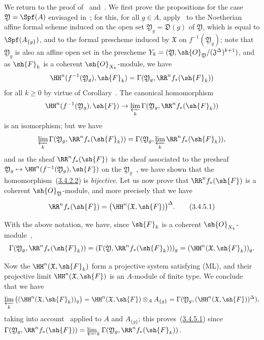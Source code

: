 \begin{env}[3.4.5]
\label{III.3.4.5}
We return to the proof of~ and~.
We first prove the propositions for the case $\mathfrak{Y}=\Spf(A)$ envisaged in~; for this, for all $g\in A$, apply~ to the Noetherian affine formal scheme induced on the open set $\mathfrak{Y}_g=\mathfrak{D}(g)$ of $\mathfrak{Y}$, which is equal to $\Spf(A_{\{g\}})$, and to the formal prescheme induced by $\mathfrak{X}$ on $f^{-1}(\mathfrak{Y}_g)$; note that $\mathfrak{Y}_g$ is also an affine open set in the prescheme $Y_k=(\mathfrak{Y},\sh{O}_\mathfrak{Y}/(\mathfrak{J}^\Delta)^{k+1})$, and as $\sh{F}_k$ is a coherent $\sh{O}_{X_k}$-module, we have
\[
  \HH^n(f^{-1}(\mathfrak{Y}_g),\sh{F}_k)=\Gamma(\mathfrak{Y}_g,\RR^n f_*(\sh{F}_k))
\]
for all $k\geq 0$ by virtue of Corollary~.
The canonical homomorphism
\[
  \HH^n(f^{-1}(\mathfrak{Y}_g),\sh{F})\to\varprojlim_k\Gamma(\mathfrak{Y}_g,\RR^n f_*(\sh{F}_k))
\]
is an isomorphism; but we have~
\[
  \varprojlim_k\Gamma(\mathfrak{Y}_g,\RR^n f_*(\sh{F}_k))=\Gamma(\mathfrak{Y}_g,\varprojlim_k\RR^n f_*(\sh{F}_k)),
\]
and as the sheaf $\RR^n f_*(\sh{F})$ is the sheaf associated to the presheaf $\mathfrak{Y}_g\mapsto\HH^n(f^{-1}(\mathfrak{Y}_g),\sh{F})$ on the $\mathfrak{Y}_g$~, we have shown that the homomorphism~(\hyperref[III.3.4.2.2]{3.4.2.2}) is \emph{bijective}.
Let us now prove that $\RR^n f_*(\sh{F})$ is a coherent $\sh{O}_\mathfrak{Y}$-module, and more precisely that we have
\[
\label{III.3.4.5.1}
  \RR^n f_*(\sh{F})=\big(\HH^n(\mathfrak{X},\sh{F})\big)^\Delta.
  \tag{3.4.5.1}
\]

With the above notation, we have, since $\sh{F}_k$ is a coherent $\sh{O}_{X_k}$-module~,
\[
  \Gamma(\mathfrak{Y}_g,\RR^n f_*(\sh{F}_k))=(\Gamma(\mathfrak{Y},\RR^n f_*(\sh{F}_k)))_g=(\HH^n(\mathfrak{X},\sh{F}_k))_g.
\]

Now the $\HH^n(\mathfrak{X},\sh{F}_k)$ form a projective system satisfying (ML), and their projective limit $\HH^n(\mathfrak{X},\sh{F})$ is an $A$-module of finite type.
We conclude~ that we have
\[
  \varprojlim_k\big((\HH^n(\mathfrak{X},\sh{F}_k))_g\big)=\HH^n(\mathfrak{X},\sh{F})\otimes_A A_{\{g\}}=\Gamma(\mathfrak{Y}_g,(\HH^n(\mathfrak{X},\sh{F}))^\Delta),
\]
taking into account~ applied to $A$ and $A_{\{g\}}$; this proves~(\hyperref[III.3.4.5.1]{3.4.5.1}) since $\Gamma(\mathfrak{Y}_g,\RR^n f_*(\sh{F}))=\varprojlim_k\Gamma(\mathfrak{Y}_g,\RR^n f_*(\sh{F}_k))$.


\end{env}
